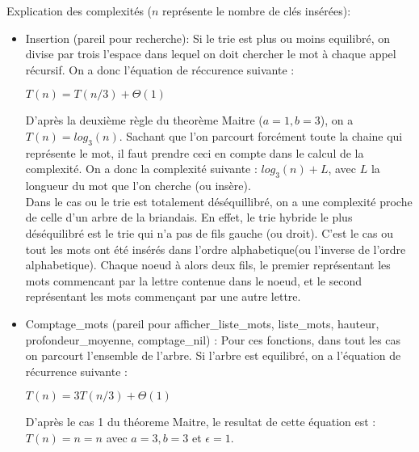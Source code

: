 \documentclass[10pt]{report}
\begin{document}
Explication des complexités ($n$ représente le nombre de clés insérées):
\begin{itemize}
\item Insertion (pareil pour recherche): Si le trie est plus ou moins equilibré, on divise par trois l'espace dans lequel on doit chercher le mot à chaque appel récursif. On a donc l'équation de réccurence suivante : \\
  \begin{center}
    $T(n)=T(n/3)+\Theta(1)$
  \end{center}
  D'après la deuxième règle du theorème Maitre ($a=1,b=3$), on a $T(n)=log_3(n)$. Sachant que l'on parcourt forcément toute la chaine qui représente le mot, il faut prendre ceci en compte dans le calcul de la complexité. On a donc   la complexité suivante : $log_3(n)+L$, avec $L$ la longueur du mot que l'on cherche (ou insère).\\
  Dans le cas ou le trie est totalement déséquillibré, on a une complexité proche de celle d'un arbre de la briandais. En effet, le trie hybride le plus déséquilibré est le trie qui n'a pas de fils gauche (ou droit). C'est le cas ou tout les mots ont été insérés dans l'ordre alphabetique(ou l'inverse de l'ordre alphabetique). Chaque noeud à alors deux fils, le premier représentant les mots commencant par la lettre contenue dans le noeud, et le second représentant les mots commençant par une autre lettre.
\item Comptage\_mots (pareil pour afficher\_liste\_mots, liste\_mots, hauteur, profondeur\_moyenne, comptage\_nil) : Pour ces fonctions, dans tout les cas on parcourt l'ensemble de l'arbre. Si l'arbre est equilibré, on a l'équation de récurrence suivante :
  \begin{center}
    $T(n)=3T(n/3)+\Theta(1)$
  \end{center} 
  D'après le cas 1 du théoreme Maitre, le resultat de cette équation est : $T(n)=n$$=n $ avec $a=3,b=3$ et $\epsilon=1$.
\end{itemize}
\end{document}
